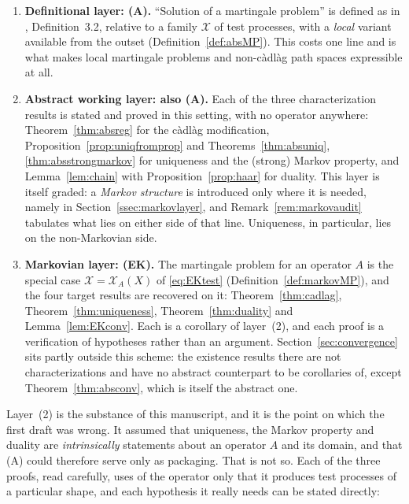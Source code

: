 \documentclass[11pt,a4paper]{article}
\theoremstyle{plain}
\theoremstyle{definition}
\theoremstyle{remark}
\newcommand{\XX}{\mathcal{X}}                  %
\newcommand{\CPS}{\cite{CPS23}}
\begin{document}
\begin{enumerate}[label=(\arabic*)]
\item \textbf{Definitional layer: (A).}
  ``Solution of a martingale problem'' is defined as in \CPS, Definition~3.2,
  relative to a family $\XX$ of test processes, with a \emph{local} variant
  available from the outset (Definition~\ref{def:absMP}).  This costs one line
  and is what makes local martingale problems and non-c\`adl\`ag path spaces
  expressible at all.

\item \textbf{Abstract working layer: also (A).}
  Each of the three characterization results is stated and proved in this
  setting, with no operator anywhere: Theorem~\ref{thm:absreg} for the c\`adl\`ag
  modification, Proposition~\ref{prop:uniqfromprop} and
  Theorems~\ref{thm:absuniq}, \ref{thm:absstrongmarkov} for uniqueness and the
  (strong) Markov property, and Lemma~\ref{lem:chain} with
  Proposition~\ref{prop:haar} for duality.  This
  layer is itself graded: a
  \emph{Markov structure} is introduced only where it is needed, namely in
  Section~\ref{ssec:markovlayer}, and Remark~\ref{rem:markovaudit} tabulates what
  lies on either side of that line.  Uniqueness, in particular, lies on the
  non-Markovian side.

\item \textbf{Markovian layer: (EK).}
  The martingale problem for an operator $A$ is the special case
  $\XX = \XX_A(X)$ of \eqref{eq:EKtest} (Definition~\ref{def:markovMP}), and the
  four target results are recovered on it: Theorem~\ref{thm:cadlag},
  Theorem~\ref{thm:uniqueness}, Theorem~\ref{thm:duality} and
  Lemma~\ref{lem:EKconv}.  Each is a corollary of layer~(2), and each proof is a
  verification of hypotheses rather than an argument.  Section~\ref{sec:convergence}
  sits partly outside this scheme: the existence results there are not
  characterizations and have no abstract counterpart to be corollaries of, except
  Theorem~\ref{thm:absconv}, which is itself the abstract one.
\end{enumerate}

Layer~(2) is the substance of this manuscript, and it is the point on which the
first draft was wrong.  It assumed that uniqueness, the Markov property and
duality are \emph{intrinsically} statements about an operator $A$ and its domain,
and that (A) could therefore serve only as packaging.  That is not so.  Each of
the three proofs, read carefully, uses of the operator only that it produces
test processes of a particular shape, and each hypothesis it really needs can be
stated directly:
\end{document}
